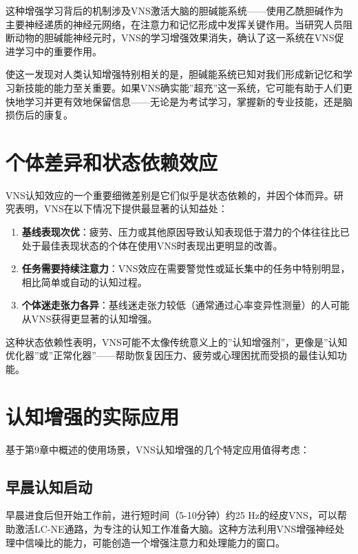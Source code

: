 \documentclass[
  Letterpaper,
]{scrbook}
\begin{document}
这种增强学习背后的机制涉及VNS激活大脑的胆碱能系统------使用乙酰胆碱作为主要神经递质的神经元网络，在注意力和记忆形成中发挥关键作用。当研究人员阻断动物的胆碱能神经元时，VNS的学习增强效果消失，确认了这一系统在VNS促进学习中的重要作用。

使这一发现对人类认知增强特别相关的是，胆碱能系统已知对我们形成新记忆和学习新技能的能力至关重要。如果VNS确实能''超充''这一系统，它可能有助于人们更快地学习并更有效地保留信息------无论是为考试学习，掌握新的专业技能，还是脑损伤后的康复。

\section{个体差异和状态依赖效应}\label{ux4e2aux4f53ux5deeux5f02ux548cux72b6ux6001ux4f9dux8d56ux6548ux5e94}

VNS认知效应的一个重要细微差别是它们似乎是状态依赖的，并因个体而异。研究表明，VNS在以下情况下提供最显著的认知益处：

\begin{enumerate}
\def\labelenumi{\arabic{enumi}.}
\item
  \textbf{基线表现次优}：疲劳、压力或其他原因导致认知表现低于潜力的个体往往比已处于最佳表现状态的个体在使用VNS时表现出更明显的改善。
\item
  \textbf{任务需要持续注意力}：VNS效应在需要警觉性或延长集中的任务中特别明显，相比简单或自动的认知过程。
\item
  \textbf{个体迷走张力各异}：基线迷走张力较低（通常通过心率变异性测量）的人可能从VNS获得更显著的认知增强。
\end{enumerate}

这种状态依赖性表明，VNS可能不太像传统意义上的''认知增强剂''，更像是''认知优化器''或''正常化器''------帮助恢复因压力、疲劳或心理困扰而受损的最佳认知功能。

\section{认知增强的实际应用}\label{ux8ba4ux77e5ux589eux5f3aux7684ux5b9eux9645ux5e94ux7528}

基于第9章中概述的使用场景，VNS认知增强的几个特定应用值得考虑：

\subsection{早晨认知启动}\label{ux65e9ux6668ux8ba4ux77e5ux542fux52a8}

早晨进食后但开始工作前，进行短时间（5-10分钟）约25
Hz的经皮VNS，可以帮助激活LC-NE通路，为专注的认知工作准备大脑。这种方法利用VNS增强神经处理中信噪比的能力，可能创造一个增强注意力和处理能力的窗口。
\end{document}
